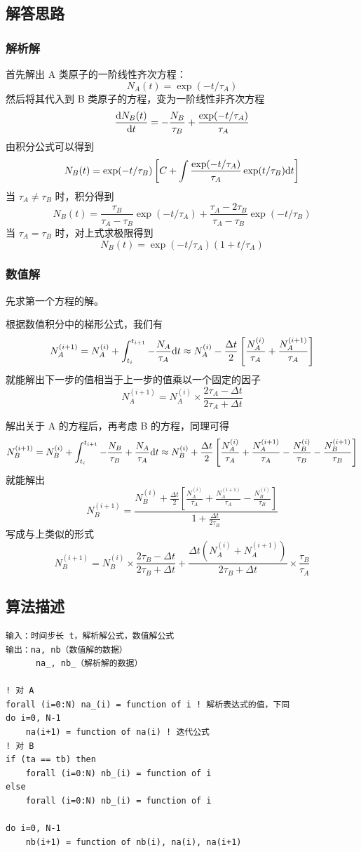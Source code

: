 \documentclass{ctexart}
\begin{document}
\subsection{解答思路}
\subsubsection{解析解}
首先解出 A 类原子的一阶线性齐次方程：
\[
N_A(t)=\exp(-t/\tau_A)
\]
然后将其代入到 B 类原子的方程，变为一阶线性非齐次方程
\[
\frac{\mathrm{d} N_B(t)}{\mathrm{d} t}=-\frac{N_B}{\tau_B}+\frac{\exp(-t/\tau_A)}{\tau_A}
\]
由积分公式可以得到
\[
N_B(t)=\exp(-t/\tau_B)\left[C+\int \frac{\exp(-t/\tau_A)}{\tau_A} \exp(t/\tau_B) \mathrm{d} t\right]
\]
当 $\tau_A\ne\tau_B$ 时，积分得到
\[
N_B(t)=\frac{\tau_B}{\tau_A-\tau_B}\exp(-t/\tau_A)+\frac{\tau_A-2\tau_B}{\tau_A-\tau_B}\exp(-t/\tau_B)
\]
当 $\tau_A=\tau_B$ 时，对上式求极限得到
\[
N_B(t)=\exp(-t/\tau_A)(1+t/\tau_A)
\]
\subsubsection{数值解}
先求第一个方程的解。

根据数值积分中的梯形公式，我们有
\[
N_A^{(i+1)}=N_A^{(i)}+\int_{t_i}^{t_{i+1}}-\frac{N_A}{\tau_A}\mathrm{d} t\approx N_A^{(i)}-\frac{\Delta t}2\left[\frac{N_A^{(i)}}{\tau_A}+\frac{N_A^{(i+1)}}{\tau_A}\right]
\]
就能解出下一步的值相当于上一步的值乘以一个固定的因子
\[
N_A^{(i+1)}=N_A^{(i)}\times \frac{2\tau_A-\Delta t}{2\tau_A+\Delta t}
\]

解出关于 A 的方程后，再考虑 B 的方程，同理可得
\[
N_B^{(i+1)}=N_B^{(i)}+\int_{t_i}^{t_{i+1}}-\frac{N_B}{\tau_B}+\frac{N_A}{\tau_A}\mathrm{d} t\approx N_B^{(i)}+\frac{\Delta t}2\left[\frac{N_A^{(i)}}{\tau_A}+\frac{N_A^{(i+1)}}{\tau_A}-\frac{N_B^{(i)}}{\tau_B}-\frac{N_B^{(i+1)}}{\tau_B}\right]
\]
就能解出
\[
N_B^{(i+1)}=\frac{N_B^{(i)}+\frac{\Delta t}2\left[\frac{N_A^{(i)}}{\tau_A}+\frac{N_A^{(i+1)}}{\tau_A}-\frac{N_B^{(i)}}{\tau_B}\right]}{1+\frac{\Delta t}{2\tau_B}}
\]
写成与上类似的形式
\[
N_B^{(i+1)}=N_B^{(i)}\times\frac{2\tau_B-\Delta t}{2\tau_B+\Delta t}+\frac{\Delta t(N_A^{(i)}+N_A^{(i+1)})}{2\tau_B+\Delta t}\times\frac{\tau_B}{\tau_A}
\]
\subsection{算法描述}
\begin{lstlisting}
输入：时间步长 t，解析解公式，数值解公式
输出：na, nb（数值解的数据）
      na_, nb_（解析解的数据）

! 对 A
forall (i=0:N) na_(i) = function of i ! 解析表达式的值，下同
do i=0, N-1
    na(i+1) = function of na(i) ! 迭代公式
! 对 B
if (ta == tb) then
    forall (i=0:N) nb_(i) = function of i
else
    forall (i=0:N) nb_(i) = function of i

do i=0, N-1
    nb(i+1) = function of nb(i), na(i), na(i+1)
\end{lstlisting}
\end{document}
